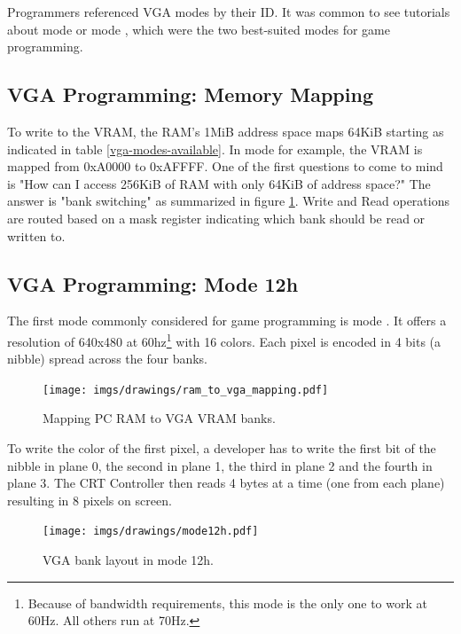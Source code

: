 \documentclass[book.tex]{subfiles}
\begin{document}
 Programmers referenced VGA modes by their ID. It was common to see tutorials about mode  or mode , which were the two best-suited modes for game programming.


 \subsection{VGA Programming: Memory Mapping}
To write to the VRAM, the RAM's 1MiB address space maps 64KiB starting as indicated in table \ref{vga-modes-available}. In mode  for example, the VRAM is mapped from 0xA0000 to 0xAFFFF. One of the first questions to come to mind is "How can I access 256KiB of RAM with only 64KiB of address space?" The answer is "bank switching" as summarized in figure \ref{ram_to_vga_mapping_label}. Write and Read operations are routed based on a mask register indicating which bank should be read or written to. \\
\par

 \subsection{VGA Programming: Mode 12h}
 The first mode commonly considered for game programming is mode . It offers a resolution of 640x480 at 60hz\footnote{Because of bandwidth requirements, this mode is the only one to work at 60Hz. All others run at 70Hz.} with 16 colors. Each pixel is encoded in 4 bits (a nibble) spread across the four banks.\\
\par



\begin{figure}[H]
  \centering
  \texttt{[image: imgs/drawings/ram\_to\_vga\_mapping.pdf]}
  \caption{Mapping PC RAM to VGA VRAM banks.}
  \label{ram_to_vga_mapping_label}
\end{figure}
\par
 To write the color of the first pixel, a developer has to write the first bit of the nibble in plane 0, the second in plane 1, the third in plane 2 and the fourth in plane 3. The CRT Controller then reads 4 bytes at a time (one from each plane) resulting in 8 pixels on screen.\\
\par
 


\begin{figure}[H]
\centering
 \texttt{[image: imgs/drawings/mode12h.pdf]}
\caption{VGA bank layout in mode 12h.}
\end{figure}
\pagebreak
\end{document}
